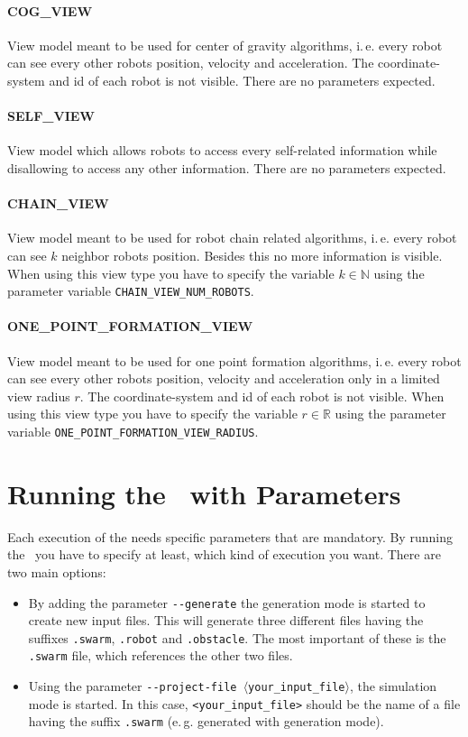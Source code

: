 \paragraph{COG\_VIEW} View model meant to be used for center of gravity algorithms, i.\,e. every robot can see every other robots position, velocity and acceleration. The coordinate-system and id of each robot is not visible. There are no parameters expected.

\paragraph{SELF\_VIEW} View model which allows robots to access every self-related information while disallowing to access any other information. There are no parameters expected.

\paragraph{CHAIN\_VIEW} View model meant to be used for robot chain related algorithms, i.\,e. every robot can see $k$ neighbor robots position. Besides this no more information is visible. When using this view type you have to specify the variable $k \in \mathbb{N}$ using the parameter variable \texttt{CHAIN\_VIEW\_NUM\_ROBOTS}.

\paragraph{ONE\_POINT\_FORMATION\_VIEW} View model meant to be used for one point formation algorithms, i.\,e. every robot can see every other robots position, velocity and acceleration only in a limited view radius $r$. The coordinate-system and id of each robot is not visible. When using this view type you have to specify the variable $r \in \mathbb{R}$ using the parameter variable \texttt{ONE\_POINT\_FORMATION\_VIEW\_RADIUS}.


\section{Running the \RSS\ with Parameters}
Each execution of the \RSS needs specific parameters that are mandatory. By running the \RSS\ you have to specify at least, which kind of execution you want. There are two main options:

\begin{itemize}
	\item By adding the parameter {\tt -{}-generate} the generation mode is started to create new input files. This will generate three different files having the suffixes {\tt .swarm}, {\tt .robot} and {\tt .obstacle}. The most important of these is the {\tt .swarm} file, which references the other two files.
	\item Using the parameter {\tt -{}-project-file $\langle$your\_input\_file$\rangle$}, the simulation mode is started. In this case, \texttt{<your\_input\_file>} should be the name of a file having the suffix {\tt .swarm} (e.\,g. generated with generation mode).
\end{itemize}

